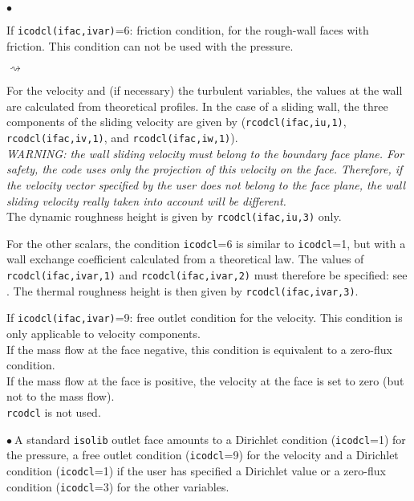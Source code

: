 {{{\begin{list}{$\bullet$}{}
\item If \texttt{icodcl(ifac,ivar)}=6: friction condition, for the rough-wall faces
      with friction. This condition can not be used with the pressure.
\begin{list}{$\rightsquigarrow$}{}
\item For the velocity and (if necessary) the turbulent variables, the
      values at the wall are calculated from theoretical profiles. In
      the case of a sliding wall, the three components of the sliding
      velocity are given by (\texttt{rcodcl(ifac,iu,1)},
      \texttt{rcodcl(ifac,iv,1)}, and \texttt{rcodcl(ifac,iw,1)}).\\
{\em WARNING: the wall sliding velocity must belong to the boundary face
      plane. For safety, the code uses only the projection of this
      velocity on the face. Therefore, if the velocity vector specified
      by the user does not belong to the face plane, the wall sliding velocity really
      taken into account will be different.}\\
      The dynamic roughness height is given by \texttt{rcodcl(ifac,iu,3)} only.

\item For the other scalars, the condition \texttt{icodcl}=6 is similar to
      \texttt{icodcl}=1, but with a wall exchange coefficient calculated from a
      theoretical law. The values of \texttt{rcodcl(ifac,ivar,1)} and
      \texttt{rcodcl(ifac,ivar,2)} must therefore be specified: see \cite{theory}.
      The thermal roughness height is then given by \texttt{rcodcl(ifac,ivar,3)}.
\end{list}

\item If \texttt{icodcl(ifac,ivar)}=9: free outlet condition for the
      velocity. This condition is only applicable to velocity
      components.\\
If the mass flow at the face negative, this condition is equivalent
      to a zero-flux condition.\\
If the mass flow at the face is positive, the velocity at the face is set to zero (but not to the mass flow).\\
\texttt{rcodcl} is not used.

\end{list}

$\bullet\ $A standard \texttt{isolib} outlet face amounts to a Dirichlet
condition (\texttt{icodcl}=1) for the pressure, a free outlet condition
(\texttt{icodcl}=9) for the velocity and a Dirichlet condition
(\texttt{icodcl}=1) if the user has specified a Dirichlet value or a zero-flux
condition (\texttt{icodcl}=3) for the other variables.\\

}}}
